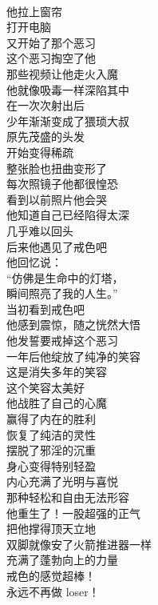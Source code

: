 \begin{poem}[内在的胜利]
    \begin{multicols}{3}
        \centering~\\
        他拉上窗帘 \\ 打开电脑 \\ 又开始了那个恶习 \\ 这个恶习掏空了他 \\ 那些视频让他走火入魔 \\ 他就像吸毒一样深陷其中 \\ 在一次次射出后 \\ 少年渐渐变成了猥琐大叔 \\ 原先茂盛的头发 \\ 开始变得稀疏 \\ 整张脸也扭曲变形了 \\ 每次照镜子他都很惶恐 \\ 看到以前照片他会哭 \\ 他知道自己已经陷得太深 \\ 几乎难以回头 \\ 后来他遇见了戒色吧 \\ 他回忆说： \\ “仿佛是生命中的灯塔， \\ 瞬间照亮了我的人生。” \\ 当初看到戒色吧 \\ 他感到震惊，随之恍然大悟 \\ 他发誓要戒掉这个恶习 \\ 一年后他绽放了纯净的笑容 \\ 这是消失多年的笑容 \\ 这个笑容太美好 \\ 他战胜了自己的心魔 \\ 赢得了内在的胜利 \\ 恢复了纯洁的灵性 \\ 摆脱了邪淫的沉重 \\ 身心变得特别轻盈 \\ 内心充满了光明与喜悦 \\ 那种轻松和自由无法形容 \\ 他重生了！一股超强的正气 \\ 把他撑得顶天立地 \\ 双脚就像安了火箭推进器一样 \\ 充满了蓬勃向上的力量 \\ 戒色的感觉超棒！ \\ 永远不再做 loser！
    \end{multicols}
\end{poem}

